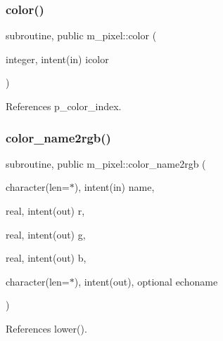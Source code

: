 \subsubsection{\texorpdfstring{color()}{color()}}
{\footnotesize\ttfamily subroutine, public m\+\_\+pixel\+::color (\begin{DoxyParamCaption}\item[{integer, intent(in)}]{icolor }\end{DoxyParamCaption})}



References p\+\_\+color\+\_\+index.

\mbox{\label{namespacem__pixel_aee26ac45961d4093d2e472fcb6e1887d}} 
\subsubsection{\texorpdfstring{color\+\_\+name2rgb()}{color\_name2rgb()}}
{\footnotesize\ttfamily subroutine, public m\+\_\+pixel\+::color\+\_\+name2rgb (\begin{DoxyParamCaption}\item[{character(len=$\ast$), intent(in)}]{name,  }\item[{real, intent(out)}]{r,  }\item[{real, intent(out)}]{g,  }\item[{real, intent(out)}]{b,  }\item[{character(len=$\ast$), intent(out), optional}]{echoname }\end{DoxyParamCaption})}



References lower().

